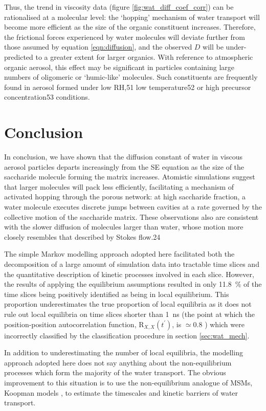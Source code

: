 Thus, the trend in viscosity data (figure \ref{fig:wat_diff_coef_corr}) can be rationalised at a molecular level: the `hopping’ mechanism of water transport will become more efficient as the size of the organic constituent increases. Therefore, the frictional forces experienced by water molecules will deviate further from those assumed by equation \ref{eqn:diffusion}, and the observed $D$ will be under-predicted to a greater extent for larger organics. With reference to atmospheric organic aerosol, this effect may be significant in particles containing large numbers of oligomeric or ‘humic-like’ molecules. Such constituents are frequently found in aerosol formed under low RH,51 low temperature52 or high precursor concentration53 conditions.

\section{Conclusion}\label{sec:wat_conclusions}
In conclusion, we have shown that the diffusion constant of water in viscous aerosol particles departs increasingly from the SE equation as the size of the saccharide molecule forming the matrix increases. Atomistic simulations suggest that larger molecules will pack less efficiently, facilitating a mechanism of activated hopping through the porous network: at high saccharide fraction, a water molecule executes discrete jumps between cavities at a rate governed by the collective motion of the saccharide matrix. These observations also are consistent with the slower diffusion of molecules larger than water, whose motion more closely resembles that described by Stokes flow.24

The simple Markov modelling approach adopted here facilitated both the decomposition of a large amount of simulation data into tractable time slices and the quantitative description of kinetic processes involved in each slice. However, the results of applying the equilibrium assumptions resulted in only \SI{11.8}{\percent} of the time slices being  positively identified as being in local equilibrium. This proportion underestimates the true proportion of local equilibria as it does not rule out local equilibria on time slices shorter than \SI{1}{\nano\second} (the point at which the position-position autocorrelation function, $\mathrm{R}_{X,  X}(t^{\prime})$, is $\simeq 0.8$ ) which were incorrectly classified by the classification procedure in section \ref{sec:wat_mech}.  

In addition to underestimating the number of local equilibria, the modelling approach adopted here does not say anything about the non-equilibrium processes which form the majority of the water transport. The obvious improvement to this situation is to use the non-equilibrium analogue of MSMs, Koopman models \cite{wuVariationalApproachLearning2019}, to estimate the timescales and kinetic barriers of water transport. 

